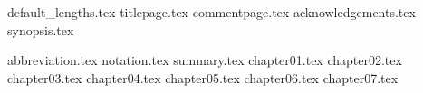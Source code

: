 \documentclass{report}
\begin{document}
	{default_lengths.tex}
	{titlepage.tex}
	{commentpage.tex}
	{acknowledgements.tex}
	{synopsis.tex}
	\tableofcontents %
	\newpage{}
	\listoffigures %
	\listoftables %
	\newpage
	{abbreviation.tex}
	{notation.tex}
	{summary.tex}
	{chapter01.tex}
	{chapter02.tex}
	{chapter03.tex}
	{chapter04.tex}
	{chapter05.tex}
	{chapter06.tex}
	{chapter07.tex}
	
	\printbibliography
	
	
\end{document}
